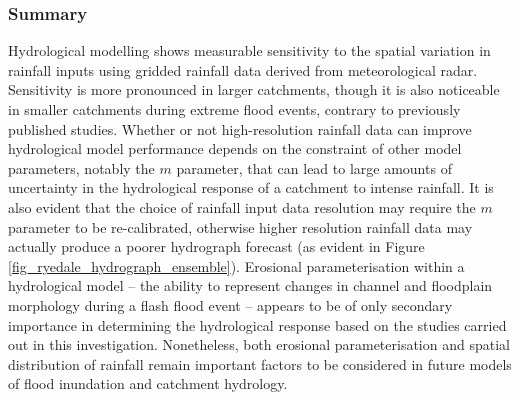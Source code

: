 \subsubsection{Summary}
Hydrological modelling shows measurable sensitivity to the spatial variation in rainfall inputs using gridded rainfall data derived from meteorological radar. Sensitivity is more pronounced in larger catchments, though it is also noticeable in smaller catchments during extreme flood events, contrary to previously published studies. Whether or not high-resolution  rainfall data can improve hydrological model performance depends on the constraint of other model parameters, notably the \(m\) parameter, that can lead to large amounts of uncertainty in the hydrological response of a catchment to intense rainfall. It is also evident that the choice of rainfall input data resolution may require the \(m\) parameter to be re-calibrated, otherwise higher resolution rainfall data may actually produce a poorer hydrograph forecast (as evident in Figure \ref{fig_ryedale_hydrograph_ensemble}). Erosional parameterisation within a hydrological model -- the ability to represent changes in channel and floodplain morphology during a flash flood event -- appears to be of only secondary importance in determining the hydrological response based on the studies carried out in this investigation. Nonetheless, both erosional parameterisation and spatial distribution of rainfall remain important factors to be considered in future models of flood inundation and catchment hydrology.




